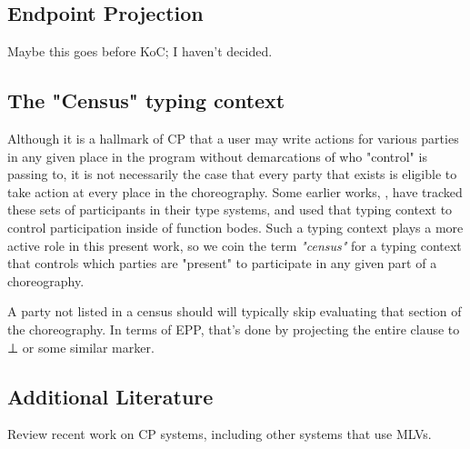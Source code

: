 \subsection{Endpoint Projection}
\label{sec:endpoint-projection}
Maybe this goes before KoC; I haven't decided.

\subsection{The "Census" typing context}
\label{sec:census}
Although it is a hallmark of CP that a user may write actions for various parties in any given place in the program
without demarcations of who "control" is passing to,
it is not necessarily the case that every party that exists is eligible to take action at every place in the choreography.
Some earlier works, \eg \cite{chor-lambda}, have tracked these sets of participants in their type systems,
and used that typing context to control participation inside of function bodes.
Such a typing context plays a more active role in this present work, so we coin the term \emph{"census"}
for a typing context that controls which parties are "present" to participate in any given part of a choreography.

A party not listed in a census should will typically skip evaluating that section of the choreography.
In terms of EPP, that's done by projecting the entire clause to ⊥ or some similar marker.

\subsection{Additional Literature}
\label{sec:modern-work}

Review recent work on CP systems, including other systems that use MLVs.




